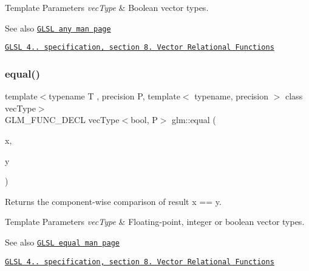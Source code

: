\begin{DoxyTemplParams}{Template Parameters}
{\em vec\+Type} & Boolean vector types.\\
\hline
\end{DoxyTemplParams}
\begin{DoxySeeAlso}{See also}
\href{http://www.opengl.org/sdk/docs/manglsl/xhtml/any.xml}{\tt G\+L\+SL any man page} 

\href{http://www.opengl.org/registry/doc/GLSLangSpec.4.20.8.pdf}{\tt G\+L\+SL 4.. specification, section 8. Vector Relational Functions} 
\end{DoxySeeAlso}
\mbox{\label{group__core__func__vector__relational_ga39c80d8baf49b0ce69f2bb22d45b3801}} 
\subsubsection{\texorpdfstring{equal()}{equal()}}
{\footnotesize\ttfamily template$<$typename T , precision P, template$<$ typename, precision $>$ class vec\+Type$>$ \\
G\+L\+M\+\_\+\+F\+U\+N\+C\+\_\+\+D\+E\+CL vec\+Type$<$bool, P$>$ glm\+::equal (\begin{DoxyParamCaption}\item[{vec\+Type$<$ T, P $>$ const \&}]{x,  }\item[{vec\+Type$<$ T, P $>$ const \&}]{y }\end{DoxyParamCaption})}

Returns the component-\/wise comparison of result x == y.


\begin{DoxyTemplParams}{Template Parameters}
{\em vec\+Type} & Floating-\/point, integer or boolean vector types.\\
\hline
\end{DoxyTemplParams}
\begin{DoxySeeAlso}{See also}
\href{http://www.opengl.org/sdk/docs/manglsl/xhtml/equal.xml}{\tt G\+L\+SL equal man page} 

\href{http://www.opengl.org/registry/doc/GLSLangSpec.4.20.8.pdf}{\tt G\+L\+SL 4.. specification, section 8. Vector Relational Functions} 
\end{DoxySeeAlso}
\mbox{\label{group__core__func__vector__relational_gadd80263161a308462d3e3e287e79cccd}} 
